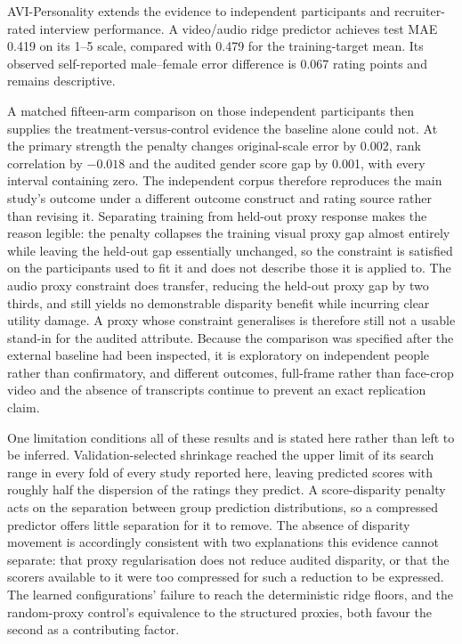 AVI-Personality extends the evidence to independent participants and recruiter-rated
interview performance. A video/audio ridge predictor achieves test MAE 0.419 on its
1--5 scale, compared with 0.479 for the training-target mean. Its observed self-reported
male--female error difference is 0.067 rating points and remains descriptive.

A matched fifteen-arm comparison on those independent participants then supplies the
treatment-versus-control evidence the baseline alone could not. At the primary strength
the penalty changes original-scale error by 0.002, rank correlation by $-0.018$ and the
audited gender score gap by 0.001, with every interval containing zero. The independent
corpus therefore reproduces the main study's outcome under a different outcome construct
and rating source rather than revising it. Separating training from held-out proxy
response makes the reason legible: the penalty collapses the training visual proxy gap
almost entirely while leaving the held-out gap essentially unchanged, so the constraint is
satisfied on the participants used to fit it and does not describe those it is applied to.
The audio proxy constraint does transfer, reducing the held-out proxy gap by two thirds,
and still yields no demonstrable disparity benefit while incurring clear utility damage.
A proxy whose constraint generalises is therefore still not a usable stand-in for the
audited attribute. Because the comparison was specified after the external baseline had
been inspected, it is exploratory on independent people rather than confirmatory, and
different outcomes, full-frame rather than face-crop video and the absence of transcripts
continue to prevent an exact replication claim.

One limitation conditions all of these results and is stated here rather than left to be
inferred. Validation-selected shrinkage reached the upper limit of its search range in
every fold of every study reported here, leaving predicted scores with roughly half the
dispersion of the ratings they predict. A score-disparity penalty acts on the separation
between group prediction distributions, so a compressed predictor offers little separation
for it to remove. The absence of disparity movement is accordingly consistent with two
explanations this evidence cannot separate: that proxy regularisation does not reduce
audited disparity, or that the scorers available to it were too compressed for such a
reduction to be expressed. The learned configurations' failure to reach the deterministic
ridge floors, and the random-proxy control's equivalence to the structured proxies, both
favour the second as a contributing factor.

